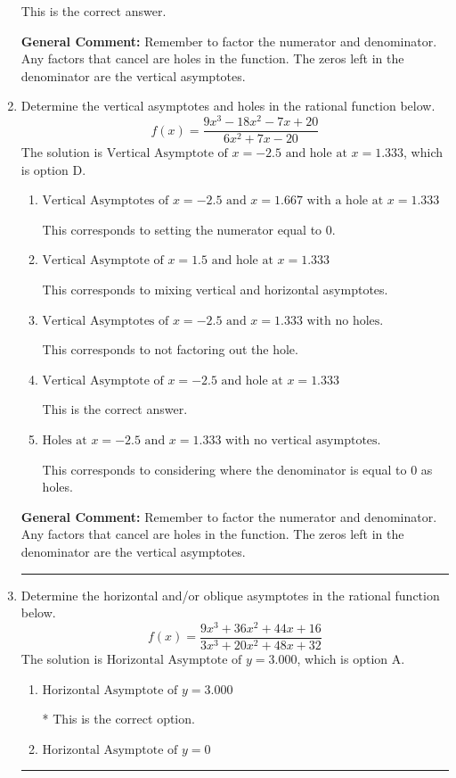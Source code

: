\documentclass{extbook}[14pt]
\newcommand{\litem}[1]{\item #1

\rule{\textwidth}{0.4pt}}
\begin{document}
\begin{enumerate}
{\begin{enumerate}[label=\Alph*.]
This is the correct answer.
\end{enumerate}

\textbf{General Comment:} Remember to factor the numerator and denominator. Any factors that cancel are holes in the function. The zeros left in the denominator are the vertical asymptotes.
}
\litem{
Determine the vertical asymptotes and holes in the rational function below.
\[ f(x) = \frac{9x^{3} -18 x^{2} -7 x + 20}{6x^{2} +7 x -20} \]The solution is \( \text{Vertical Asymptote of } x = -2.5 \text{ and hole at } x = 1.333 \), which is option D.\begin{enumerate}[label=\Alph*.]
\item \( \text{Vertical Asymptotes of } x = -2.5 \text{ and } x = 1.667 \text{ with a hole at } x = 1.333 \)

This corresponds to setting the numerator equal to 0.
\item \( \text{Vertical Asymptote of } x = 1.5 \text{ and hole at } x = 1.333 \)

This corresponds to mixing vertical and horizontal asymptotes.
\item \( \text{Vertical Asymptotes of } x = -2.5 \text{ and } x = 1.333 \text{ with no holes.} \)

This corresponds to not factoring out the hole.
\item \( \text{Vertical Asymptote of } x = -2.5 \text{ and hole at } x = 1.333 \)

This is the correct answer.
\item \( \text{Holes at } x = -2.5 \text{ and } x = 1.333 \text{ with no vertical asymptotes.} \)

This corresponds to considering where the denominator is equal to 0 as holes.
\end{enumerate}

\textbf{General Comment:} Remember to factor the numerator and denominator. Any factors that cancel are holes in the function. The zeros left in the denominator are the vertical asymptotes.
}
\litem{
Determine the horizontal and/or oblique asymptotes in the rational function below.
\[ f(x) = \frac{9x^{3} +36 x^{2} +44 x + 16}{3x^{3} +20 x^{2} +48 x + 32} \]The solution is \( \text{Horizontal Asymptote of } y = 3.000  \), which is option A.\begin{enumerate}[label=\Alph*.]
\item \( \text{Horizontal Asymptote of } y = 3.000  \)

* This is the correct option.
\item \( \text{Horizontal Asymptote of } y = 0  \)


\end{enumerate}}
\end{enumerate}
\end{document}

